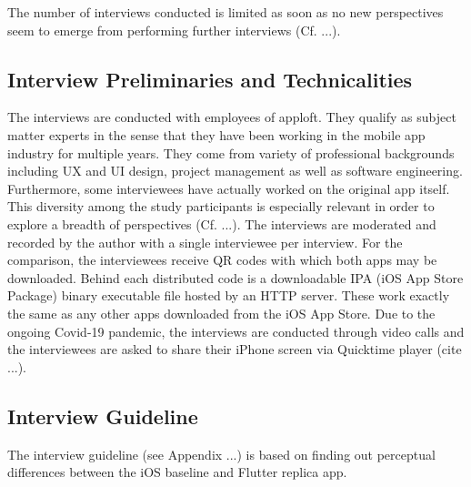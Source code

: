 The number of interviews conducted is limited as soon as no new perspectives seem to emerge from performing further interviews (Cf. ...).


\subsection{Interview Preliminaries and Technicalities}
The interviews are conducted with employees of apploft. They qualify as subject matter experts in the sense that they have been working in the mobile app industry for multiple years. They come from variety
of professional backgrounds including UX and UI design, project management as well as software engineering. Furthermore, some interviewees have actually worked on the original app itself. This diversity 
among the study participants is especially relevant in order to explore a breadth of perspectives (Cf. ...). 
The interviews are moderated and recorded by the author with a single interviewee per interview.
For the comparison, the interviewees receive QR codes with which both apps may be downloaded. Behind each distributed code is a downloadable IPA (iOS App Store Package) binary executable file hosted by an HTTP server.
These work exactly the same as any other apps downloaded from the iOS App Store.
Due to the ongoing Covid-19 pandemic, the interviews are conducted through video calls and the interviewees are asked to share their iPhone screen via Quicktime player (cite ...).

\subsection{Interview Guideline} \label{subsection::interview_guideline}
The interview guideline (see Appendix ...) is based on finding out perceptual differences between the iOS baseline and Flutter replica app. 

